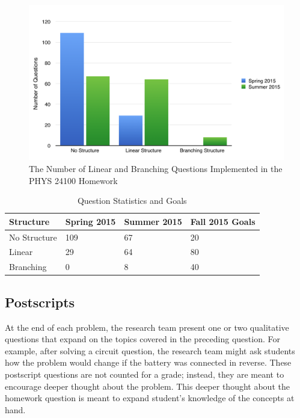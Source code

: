 \begin{figure}[!htb]
	\centering
	\includegraphics[width=6in]{img/chapter4/question_statistics}
	\caption[The Number of Linear and Branching Questions Implemented in the PHYS 24100 Homework]{The Number of Linear and Branching Questions Implemented in the PHYS 24100 Homework}
  \label{fig:questionStatistics}
\end{figure}

\begin{table}[!ht]
  \centering
  \begin{tabular}{|l|l|l|l|}
    \hline
    \textbf{Structure} & \textbf{Spring 2015} & \textbf{Summer 2015} & \textbf{Fall 2015 Goals}\\
	\hline
	No Structure & 109 & 67 & 20\\
	\hline
	Linear & 29 & 64 & 80\\
	\hline
	Branching & 0 & 8 & 40\\
	\hline
  \end{tabular}
  \caption{Question Statistics and Goals}
  \label{tab:questionStats}
\end{table}

\subsection{Postscripts}

At the end of each problem, the research team present one or two qualitative questions that expand on the topics covered in the preceding question. For example, after solving a circuit question, the research team might ask students how the problem would change if the battery was connected in reverse. These postscript questions are not counted for a grade; instead, they are meant to encourage deeper thought about the problem. This deeper thought about the homework question is meant to expand student’s knowledge of the concepts at hand.

